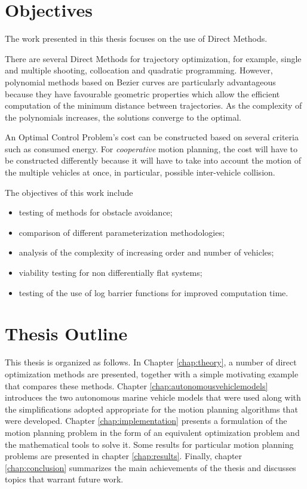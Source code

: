 \section{Objectives}

\par The work presented in this thesis focuses on the use of Direct Methods.
\par There are several Direct Methods for trajectory optimization, for example, single and multiple shooting, collocation and quadratic programming. However, polynomial methods based on Bezier curves are particularly advantageous because they have favourable geometric properties which allow the efficient computation of the minimum distance between trajectories. As the complexity of the polynomials increases, the solutions converge to the optimal. \cite{cichella2018bernstein}
\par An Optimal Control Problem's cost can be constructed based on several criteria such as consumed energy. For \textit{cooperative} motion planning, the cost will have to be constructed differently because it will have to take into account the motion of the multiple vehicles at once, in particular, possible inter-vehicle collision.
\par The objectives of this work include
\begin{itemize}
    \item testing of methods for obstacle avoidance;
    \item comparison of different parameterization methodologies;
    \item analysis of the complexity of increasing order and number of vehicles;
    \item viability testing for non differentially flat systems;
    \item testing of the use of log barrier functions for improved computation time.
\end{itemize}


\section{Thesis Outline}

This thesis is organized as follows.  In Chapter \ref{chap:theory}, a number of direct optimization methods are presented, together with a simple motivating example that compares these methods. Chapter \ref{chap:autonomousvehiclemodels} introduces the two autonomous marine vehicle models that were used along with the simplifications adopted appropriate for the motion planning algorithms that were developed. Chapter \ref{chap:implementation} presents a formulation of the motion planning problem in the form of an equivalent optimization problem and the mathematical tools to solve it. Some results for particular motion planning problems are presented in chapter \ref{chap:results}. Finally, chapter \ref{chap:conclusion} summarizes the main achievements of the thesis and discusses topics that warrant future work.

